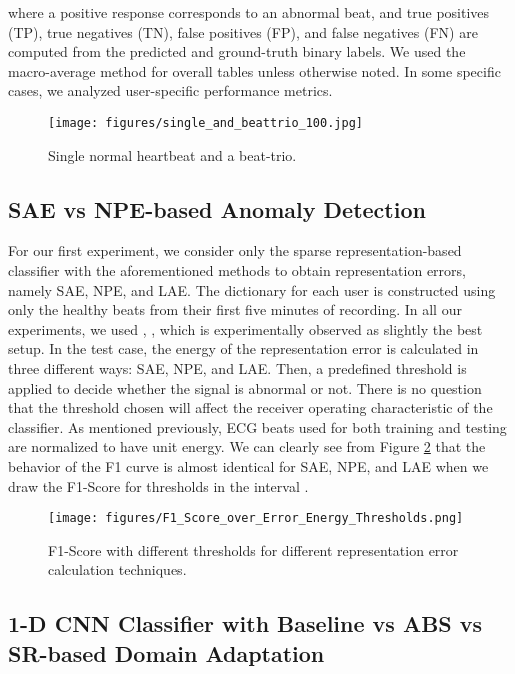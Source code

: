 \documentclass[journal,transmag]{IEEEtran}
\begin{document}
where a positive response corresponds to an abnormal beat, and true positives (TP), true negatives (TN), false positives (FP), and false negatives (FN) are computed from the predicted and ground-truth binary labels. We used the macro-average method for overall tables unless otherwise noted. In some specific cases, we analyzed user-specific performance metrics. 

\begin{figure}[!htbp]
    \captionsetup{font=footnotesize}
    \centering
    \texttt{[image: figures/single\_and\_beattrio\_100.jpg]}
    \caption{Single normal heartbeat and a beat-trio.}
    \label{fig:single_and_beattrio_100}
\end{figure}

\subsection{SAE vs NPE-based Anomaly Detection}
For our first experiment, we consider only the sparse representation-based classifier with the aforementioned methods to obtain representation errors, namely SAE, NPE, and LAE. The dictionary for each user is constructed using only the healthy beats from their first five minutes of recording. In all our experiments, we used , , which is experimentally observed as slightly the best setup.
In the test case, the energy of the representation error is calculated in three different ways: SAE, NPE, and LAE. Then, a predefined threshold is applied to decide whether the signal is abnormal or not. There is no question that the threshold chosen will affect the receiver operating characteristic of the classifier. As mentioned previously, ECG beats used for both training and testing are normalized to have unit energy. We can clearly see from Figure \ref{fig:F1overThresholds} that the behavior of the F1 curve is almost identical for SAE, NPE, and LAE when we draw the F1-Score for thresholds in the interval .


\begin{figure}[!htbp]
    \captionsetup{font=footnotesize}
    \centering
    \texttt{[image: figures/F1\_Score\_over\_Error\_Energy\_Thresholds.png]}
    \caption{F1-Score with different thresholds for different representation error calculation techniques.}
    \label{fig:F1overThresholds}
\end{figure}

\subsection{1-D CNN Classifier with Baseline vs ABS vs SR-based Domain Adaptation} \label{sec:training}
\end{document}
